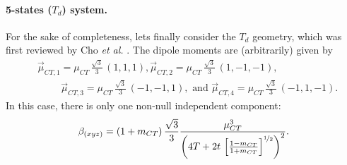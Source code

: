\documentclass[12pt,a4paper]{article}
\begin{document}
\paragraph{5-states ($T_d$) system.} For the sake of completeness, lets finally consider the $T_d$ geometry, which was first reviewed by Cho \emph{et al.} \cite{choNonlinearOpticalProperties2002}. The dipole moments are (arbitrarily) given by\begin{align}
	&\vec\mu_{CT,1} = \mu_{CT}\,\frac{\sqrt{3}}{3}\,(1, 1, 1), \vec\mu_{CT,2} = \mu_{CT}\,\frac{\sqrt{3}}{3}\,(1, -1, -1), \nonumber\\
	&\hspace{1cm}\vec\mu_{CT,3} = \mu_{CT}\,\frac{\sqrt{3}}{3}\,(-1, -1, 1), \text{ and } \vec\mu_{CT,4} = \mu_{CT}\,\frac{\sqrt{3}}{3}\,(-1, 1, -1).
\end{align}
In this case, there is only one non-null independent component:\begin{equation}
	\beta_{(xyz)} = (1+m_{CT})\,\frac{\sqrt{3}}{3}\frac{\mu_{CT}^3}{\left(4T + 2t\,\left[\frac{1-m_{CT}}{1+m_{CT}}\right]^{\nicefrac{1}{2}}\right)^2}.\label{eq:5state}
\end{equation}




	
\end{document}
